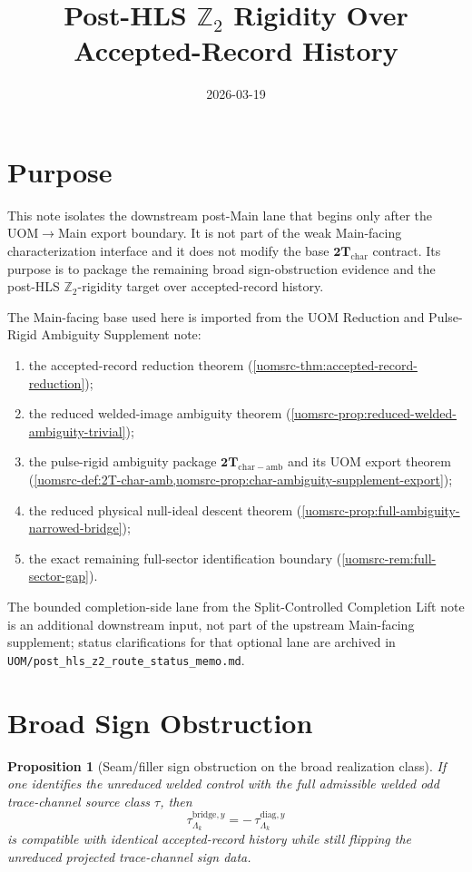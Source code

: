 \documentclass[11pt]{article}
\title{Post-HLS $\mathbb Z_2$ Rigidity Over Accepted-Record History}
\date{2026-03-19}
\newtheorem{proposition}[theorem]{Proposition}
\theoremstyle{definition}
\begin{document}
\maketitle

\section*{Purpose}

This note isolates the downstream post-Main lane that begins only after the UOM\(\to\)Main export
boundary.
It is not part of the weak Main-facing characterization interface and it does not modify the base
\(\mathbf{2T}_{\mathrm{char}}\) contract.
Its purpose is to package the remaining broad sign-obstruction evidence and the post-HLS
\(\mathbb Z_2\)-rigidity target over accepted-record history.

The Main-facing base used here is imported from
the UOM Reduction and Pulse-Rigid Ambiguity Supplement note:
\begin{enumerate}[leftmargin=2em]
\item the accepted-record reduction theorem
  \textup{(\cref{uomsrc-thm:accepted-record-reduction})};
\item the reduced welded-image ambiguity theorem
  \textup{(\cref{uomsrc-prop:reduced-welded-ambiguity-trivial})};
\item the pulse-rigid ambiguity package
  \(
  \mathbf{2T}_{\mathrm{char\!-\!amb}}
  \)
  and its UOM export theorem
  \textup{(\cref{uomsrc-def:2T-char-amb,uomsrc-prop:char-ambiguity-supplement-export})};
\item the reduced physical null-ideal descent theorem
  \textup{(\cref{uomsrc-prop:full-ambiguity-narrowed-bridge})};
\item the exact remaining full-sector identification boundary
  \textup{(\cref{uomsrc-rem:full-sector-gap})}.
\end{enumerate}
The bounded completion-side lane from the Split-Controlled Completion Lift note is an additional
downstream input, not part of the upstream Main-facing supplement; status clarifications for that
optional lane are archived in
\texttt{UOM/post\_hls\_z2\_route\_status\_memo.md}.

\section{Broad Sign Obstruction}

\begin{proposition}[Seam/filler sign obstruction on the broad realization class]
\label{prop:broad-tau-obstruction}
If one identifies the unreduced welded control with the full admissible welded odd trace-channel
source class \(\tau\), then
\[
\tau^{\mathrm{bridge},y}_{\Lambda_k}
=
-\,\tau^{\mathrm{diag},y}_{\Lambda_k}
\]
is compatible with identical accepted-record history while still flipping the unreduced projected
trace-channel sign data.
\end{proposition}
\end{document}
